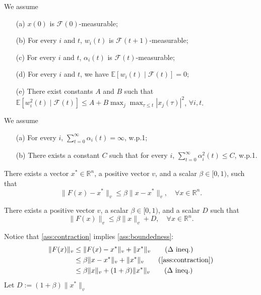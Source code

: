 \begin{assumption}\label{ass:stat}
We assume
    \begin{enumerate}
\item[(a)] $x(0)$ is $\mathcal{F}(0)$-measurable;
\item[(b)] For every $i$ and $t$, $w_i(t)$ is $\mathcal{F}(t+1)$-measurable;
\item[(c)] For every $i$ and $t$, $\alpha_i(t)$ is $\mathcal{F}(t)$-measurable;
\item[(d)] For every $i$ and $t$, we have $\mathbb{E}[w_i(t) \mid \mathcal{F}(t)] = 0$;
\item[(e)] There exist constants $A$ and $B$ such that
$\mathbb{E}[w_i^2(t) \mid \mathcal{F}(t)] \leq A + B \max_j \max_{\tau \leq t} |x_j(\tau)|^2$, $\forall i, t$.
\end{enumerate}
\end{assumption}
\begin{assumption}\label{ass:stepsize}
We assume
\begin{enumerate}
\item[(a)] For every $i$, $\sum_{t=0}^{\infty} \alpha_i(t) = \infty$, w.p.1;
\item[(b)] There exists a constant $C$ such that for every $i$, $\sum_{t=0}^{\infty} \alpha_i^2(t) \leq C$, w.p.1.
\end{enumerate}
    
\end{assumption}
\begin{assumption}[Contraction]\label{ass:contraction}
There exists a vector $x^* \in \mathbb{R}^n$, a positive vector $v$, and a scalar $\beta \in [0,1)$, such that
\begin{equation}
\|F(x) - x^*\|_v \leq \beta \|x - x^*\|_v, \quad \forall x \in \mathbb{R}^n.
\end{equation}
    
\end{assumption}

\begin{assumption}[Boundedness]\label{ass:boundedness}
    There exists a positive vector $v$, a scalar $\beta \in [0,1)$, and a scalar $D$ such that
\begin{equation}
\|F(x)\|_v \leq \beta\|x\|_v + D, \quad \forall x \in \mathbb{R}^n.
\end{equation}
\end{assumption}

\begin{remark}\label{rm:3implies4}
    Notice that \autoref{ass:contraction} implies \autoref{ass:boundedness}:
        \begin{align*}
        \|F(x)\|_v &\le \|F(x)-x^*\|_v + \|x^*\|_v\tag{$\Delta$ ineq.}\\
        &\le \beta \|x-x^*\|_v+\|x^*\|_v\tag{\autoref{ass:contraction}}\\
        &\le \beta\|x\|_v + (1+\beta) \|x^*\|_v\tag{$\Delta$ ineq.}
    \end{align*}
    Let $D:= (1+\beta)\|x^*\|_v$
\end{remark}
\newpage
